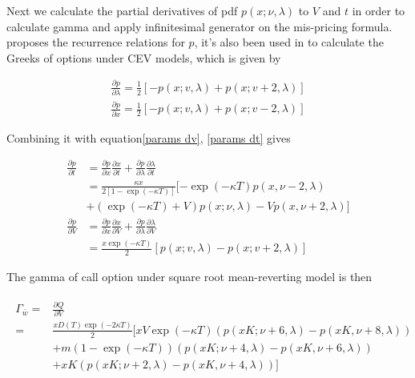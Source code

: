 Next we calculate the partial derivatives of pdf $p(x; \nu, \lambda)$ to $V$ and $t$ in order to calculate gamma and apply infinitesimal generator on the mis-pricing formula. \cite{cohen_noncentral_1988} proposes the recurrence relations for $p$, it's also been used in \cite{hossain_comparison_2019} to calculate the Greeks of options under CEV models, which is given by

\begin{equation}
    \begin{gathered}
        \frac{\partial p}{\partial \lambda}=\frac{1}{2}[-p(x ; v, \lambda)+p(x ; v+2, \lambda)] \\
        \frac{\partial p}{\partial x}=\frac{1}{2}[-p(x ; v, \lambda)+p(x ; v-2, \lambda)]
    \end{gathered}
\end{equation}



Combining it with equation\eqref{params dv}, \eqref{params dt} gives

\begin{equation}
    \begin{aligned}
        \frac{\partial p}{\partial t}&= \frac{\partial p}{\partial x}\frac{\partial x}{\partial t} + \frac{\partial p}{\partial \lambda} \frac{\partial \lambda}{\partial t} \\
        &= \frac{\kappa x }{2[1 - \exp(- \kappa T)]} [ - \exp(- \kappa T) p(x, \nu-2, \lambda)\\
        &+ (\exp(- \kappa T)+V) p(x ; \nu, \lambda) - Vp(x, \nu+2, \lambda)]\\
        \frac{\partial p}{\partial V} &= \frac{\partial p}{\partial x}\frac{\partial x}{\partial V} + \frac{\partial p}{\partial \lambda} \frac{\partial \lambda}{\partial V} \\
        &= \frac{x \exp(-\kappa T)}{2}[p(x ; v, \lambda)-p(x ; v+2, \lambda)]
    \end{aligned}
\end{equation}

The gamma of call option under square root mean-reverting model is then

\begin{equation}\label{gamma}
    \begin{aligned}
        \begin{aligned}
            \Gamma_{\bar{w}}= & \frac{\partial Q}{\partial V} \\
            =& \frac{x D(T) \exp(-2\kappa T)}{2} [
            xV \exp (-\kappa T) (p(xK; \nu+6, \lambda) - p(xK,\nu+8,\lambda)) \\
            &+m (1-\exp (-\kappa T)) (p(xK; \nu+4, \lambda)-p(xK,\nu+6,\lambda)) \\
            &+ xK (p(x K; \nu+2, \lambda)-p(xK,\nu+4,\lambda))]
            \end{aligned}
    \end{aligned}
\end{equation}


